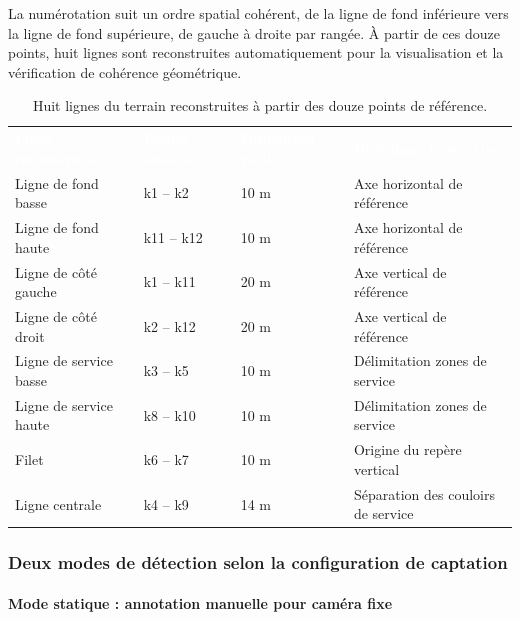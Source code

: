 La numérotation suit un ordre spatial cohérent, de la ligne de fond inférieure vers la ligne de fond supérieure, de gauche à droite par rangée. À partir de ces douze points, huit lignes sont reconstruites automatiquement pour la visualisation et la vérification de cohérence géométrique.

\begin{table}[H]
  \centering
  \renewcommand{\arraystretch}{1.3}
  \begin{tabularx}{\textwidth}{X C{3cm} C{3cm} C{3.5cm}}
    \textcolor{white}{\textbf{Ligne reconstruite}} &
    \textcolor{white}{\textbf{Points associés}} &
    \textcolor{white}{\textbf{Dimension réelle}} &
    \textcolor{white}{\textbf{Rôle dans le système}} \\
    Ligne de fond basse & k1 – k2 & 10 m & Axe horizontal de référence \\
    Ligne de fond haute & k11 – k12 & 10 m & Axe horizontal de référence \\
    Ligne de côté gauche & k1 – k11 & 20 m & Axe vertical de référence \\
    Ligne de côté droit & k2 – k12 & 20 m & Axe vertical de référence \\
    Ligne de service basse & k3 – k5 & 10 m & Délimitation zones de service \\
    Ligne de service haute & k8 – k10 & 10 m & Délimitation zones de service \\
    Filet & k6 – k7 & 10 m & Origine du repère vertical \\
    Ligne centrale & k4 – k9 & 14 m & Séparation des couloirs de service \\
  \end{tabularx}
  \caption{Huit lignes du terrain reconstruites à partir des douze points de référence.}
  \label{tab:lignes_terrain}
\end{table}

\subsubsection{Deux modes de détection selon la configuration de captation}

\paragraph{Mode statique : annotation manuelle pour caméra fixe}

